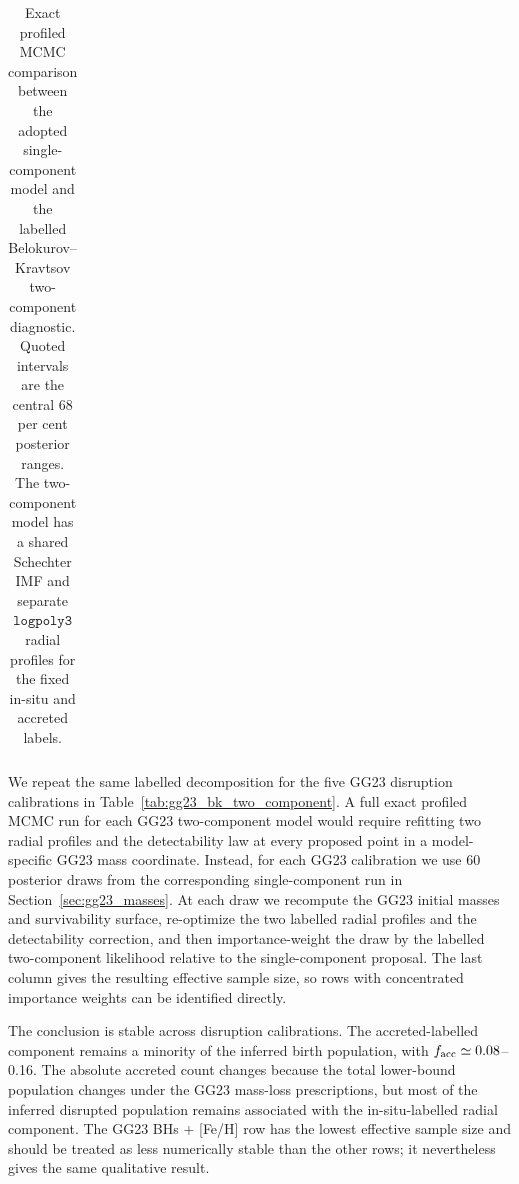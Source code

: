 \documentclass[fleqn,usenatbib]{mnras}
\begin{document}
\begin{table}
    \centering
    \caption{Exact profiled MCMC comparison between the adopted single-component model and the labelled Belokurov--Kravtsov two-component diagnostic. Quoted intervals are the central 68 per cent posterior ranges. The two-component model has a shared Schechter IMF and separate $\texttt{logpoly3}$ radial profiles for the fixed in-situ and accreted labels.}
    \label{tab:two_component_check}
    \begin{tabular}{lcccc}
        \hline
        
    \end{tabular}
\end{table}

We repeat the same labelled decomposition for the five GG23 disruption calibrations in Table~\ref{tab:gg23_bk_two_component}. A full exact profiled MCMC run for each GG23 two-component model would require refitting two radial profiles and the detectability law at every proposed point in a model-specific GG23 mass coordinate. Instead, for each GG23 calibration we use 60 posterior draws from the corresponding single-component run in Section~\ref{sec:gg23_masses}. At each draw we recompute the GG23 initial masses and survivability surface, re-optimize the two labelled radial profiles and the detectability correction, and then importance-weight the draw by the labelled two-component likelihood relative to the single-component proposal. The last column gives the resulting effective sample size, so rows with concentrated importance weights can be identified directly.

The conclusion is stable across disruption calibrations. The accreted-labelled component remains a minority of the inferred birth population, with $f_{\rm acc}\simeq 0.08$--0.16. The absolute accreted count changes because the total lower-bound population changes under the GG23 mass-loss prescriptions, but most of the inferred disrupted population remains associated with the in-situ-labelled radial component. The GG23 BHs + [Fe/H] row has the lowest effective sample size and should be treated as less numerically stable than the other rows; it nevertheless gives the same qualitative result.
\end{document}
